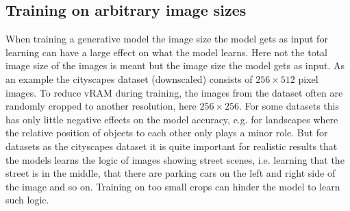 \subsection{Training on arbitrary image sizes} %
When training a generative model the image size the model gets as input for learning can have a large effect on what the model learns. Here not the total image size of the images is meant but the image size the model gets as input. As an example the cityscapes dataset (downscaled) consists of $256\times512$ pixel images. To reduce vRAM during training, the images from the dataset often are randomly cropped to another resolution, here $256\times256$. For some datasets this has only little negative effects on the model accuracy, e.g. for landscapes where the relative position of objects to each other only plays a minor role. But for datasets as the cityscapes dataset it is quite important for realistic results that the models learns the logic of images showing street scenes, i.e. learning that the street is in the middle, that there are parking cars on the left and right side of the image and so on. Training on too small crops can hinder the model to learn such logic.

